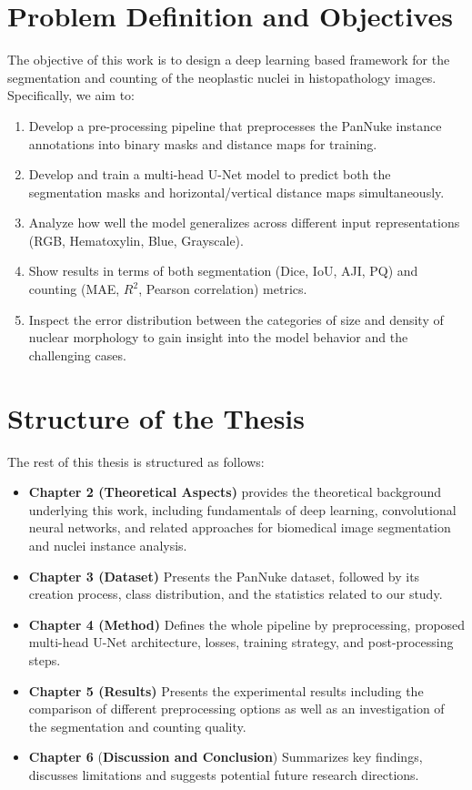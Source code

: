 \documentclass[target=bach,aauheader=,style=]{thud}
\begin{document}
\section{Problem Definition and Objectives}
The objective of this work is to design a deep learning based framework for the segmentation and counting of the neoplastic nuclei in histopathology images. Specifically, we aim to:
\begin{enumerate}
\item Develop a pre-processing pipeline that preprocesses the PanNuke instance annotations into binary masks and distance maps for training.
\item Develop and train a multi-head U-Net model to predict both the segmentation masks and horizontal/vertical distance maps simultaneously.
\item Analyze how well the model generalizes across different input representations (RGB, Hematoxylin, Blue, Grayscale).
\item Show results in terms of both segmentation (Dice, IoU, AJI, PQ) and counting (MAE, $R^2$, Pearson correlation) metrics.
\item Inspect the error distribution between the categories of size and density of nuclear morphology to gain insight into the model behavior and the challenging cases.
\end{enumerate}

\section{Structure of the Thesis}
The rest of this thesis is structured as follows:
\begin{itemize}
\item \textbf{Chapter 2 (Theoretical Aspects)} provides the theoretical background underlying this work, including fundamentals of deep learning, convolutional neural networks, and related approaches for biomedical image segmentation and nuclei instance analysis.
\item \textbf{Chapter 3 (Dataset)} Presents the PanNuke dataset, followed by its creation process, class distribution, and the statistics related to our study.
\item \textbf{Chapter 4 (Method)} Defines the whole pipeline by preprocessing, proposed multi-head U-Net architecture, losses, training strategy, and post-processing steps.
\item \textbf{Chapter 5 (Results)} Presents the experimental results including the comparison of different preprocessing options as well as an investigation of the segmentation and counting quality.
\item \textbf{Chapter 6} (\textbf{Discussion and Conclusion}) Summarizes key findings, discusses limitations and suggests potential future research directions.
\end{itemize}
\end{document}
